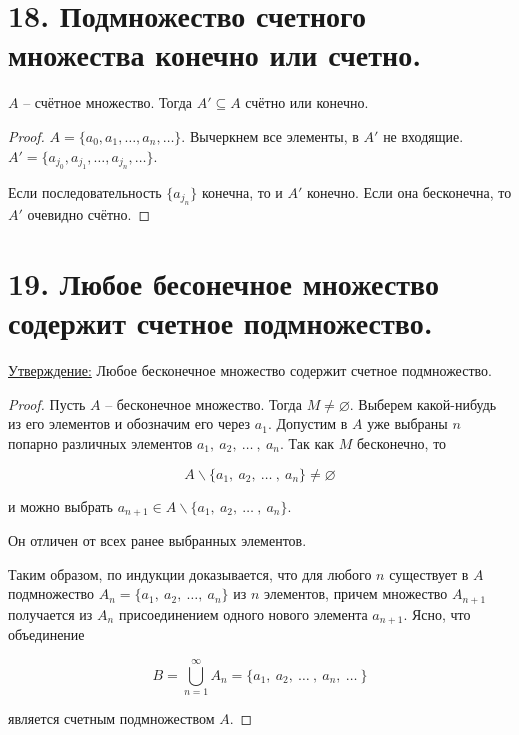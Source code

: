 \documentclass[a4paper, 12pt]{article}
\newcommand{\statement}{\underline{Утверждение:} }
\begin{document}
\section*{18. Подмножество счетного множества конечно или счетно.}

\label{prop:AsubsetA}
            $A$ -- счётное множество. Тогда $A' \subseteq A$ счётно или конечно.
            \begin{proof}
                $A = \{a_0, a_1, \ldots, a_n, \ldots\}$. Вычеркнем все элементы, в $A'$
                не входящие. $A' = \{a_{j_0}, a_{j_1}, \ldots, a_{j_n}, \ldots\}$.

                Если последовательность $\{a_{j_n}\}$ конечна, то и $A'$ конечно.
                Если она бесконечна, то $A'$ очевидно счётно.
            \end{proof}

\section*{19. Любое бесонечное множество содержит счетное подмножество.}

\statement{Любое бесконечное множество содержит счетное подмножество.}

\begin{proof}
    Пусть $A$ -- бесконечное множество. Тогда $M \neq \varnothing$. Выберем какой-нибудь из его элементов и обозначим его через $a_1$. Допустим в $A$ уже выбраны $n$ попарно различных элементов $a_1,\ a_2,\ \ldots\ ,\ a_n$. Так как $M$ бесконечно, то
    
    \[
        A \backslash \{a_1,\ a_2,\ \ldots\ ,\ a_n\} \neq \varnothing
    \]
    
    и можно выбрать $a_{n + 1} \in A \backslash \{a_1,\ a_2,\ \ldots\ ,\ a_n\}$.
    
    Он отличен от всех ранее выбранных элементов. 
    
    Таким образом, по индукции доказывается, что для любого $n$ существует в $A$ подмножество $A_n = \{a_1,\ a_2,\ \ldots,\ a_n\}$ из $n$ элементов, причем множество $A_{n + 1}$ получается из $A_n$ присоединением одного нового элемента $a_{n + 1}$. Ясно, что объединение
    
    \[
        B = \bigcup\limits_{n = 1}^{\infty}A_n = \{a_1,\ a_2,\ \ldots\ ,\ a_n,\ \ldots \ \}
    \]
    
    является счетным подмножеством $A$.
    
\end{proof}
\end{document}
